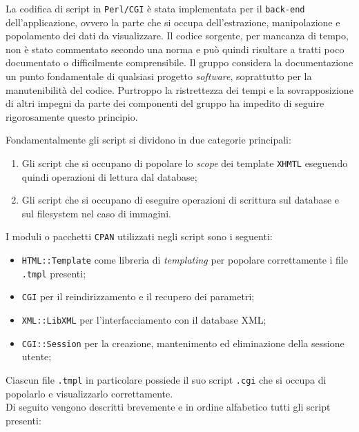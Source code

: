 La codifica di script in \texttt{Perl/CGI} è stata implementata per il \texttt{back-end} dell'applicazione, ovvero la parte che si occupa dell'estrazione, manipolazione e popolamento dei dati da visualizzare. Il codice sorgente, per mancanza di tempo, non è stato commentato secondo una norma e può quindi risultare a tratti poco documentato o difficilmente comprensibile. Il gruppo considera la documentazione un punto fondamentale di qualsiasi progetto \textit{software}, soprattutto per la manutenibilità del codice. Purtroppo la ristrettezza dei tempi e la sovrapposizione di altri impegni da parte dei componenti del gruppo ha impedito di seguire rigorosamente questo principio.

Fondamentalmente gli script si dividono in due categorie principali:

\begin{enumerate}

	\item Gli script che si occupano di popolare lo \textit{scope} dei template \texttt{XHMTL} eseguendo quindi operazioni di lettura dal database;
	\item Gli script che si occupano di eseguire operazioni di scrittura sul database e sul filesystem nel caso di immagini.

\end{enumerate}

I moduli o pacchetti \texttt{CPAN} utilizzati negli script sono i seguenti:

\begin{itemize}

	\item \texttt{HTML::Template} come libreria di \textit{templating} per popolare correttamente i file \texttt{.tmpl} presenti;
	\item \texttt{CGI} per il reindirizzamento e il recupero dei parametri;
	\item \texttt{XML::LibXML} per l'interfacciamento con il database XML;
	\item \texttt{CGI::Session} per la creazione, mantenimento ed eliminazione della sessione utente; 
\end{itemize}
Ciascun file \texttt{.tmpl} in particolare possiede il suo script \texttt{.cgi} che si occupa di popolarlo e visualizzarlo correttamente. \\
Di seguito vengono descritti brevemente e in ordine alfabetico tutti gli script presenti:

